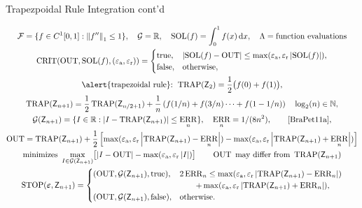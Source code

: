 \documentclass[10pt,compress,xcolor={usenames,dvipsnames},aspectratio=169]{beamer}
\DeclareMathOperator{\TRAP}{TRAP}
\DeclareMathOperator{\STOP}{STOP}
\DeclareMathOperator{\SOL}{SOL}
\DeclareMathOperator{\OUT}{OUT}
\DeclareMathOperator{\CRIT}{CRIT}
\DeclareMathOperator{\ERR}{ERR}
\newcommand{\ttrue}{\textup{true}}
\newcommand{\tfalse}{\textup{false}}
\newcommand{\tolabs}{\varepsilon_{\textup{a}}}
\newcommand{\tolrel}{\varepsilon_{\textup{r}}}
\begin{document}
\begin{frame}{Trapezpoidal Rule Integration cont'd}

\vspace{-6ex}
\begin{gather*}
	\cf = \{f \in C^1[0,1] : \norm[1]{f''} \le 1\}, \quad 
	\cg  = \reals,  \quad
	\SOL(f) = \int_0^1 f(x) \, \dif x, \quad   \Lambda = \text{function evaluations} \\
	\CRIT(\OUT, \SOL(f),(\tolabs, \tolrel))  = \begin{cases} \ttrue, & \abs{\SOL(f) - \OUT} \le \max(\tolabs,\tolrel \abs{\SOL(f)}), \\
		\tfalse, & \text{otherwise},
		\end{cases} \\
		\text{\alert{trapezoidal rule}: } 
		\TRAP(\mZ_2) = \frac 1{2} \bigl( f(0) + f(1) \bigr), \\  
		\TRAP(\mZ_{n+1}) = \frac {1}{2}\TRAP(\mZ_{n/2+1}) + \frac 1{n} \left( f(1/n) + f(3/n) \cdots + f(1 -1/n) \right)  \quad \log_2(n) \in \naturals,\\
		\cg(\mZ_{n+1}) = \{I \in \reals : \abs{I - \TRAP(\mZ_{n+1})} \le \ERR_n\},  \quad \ERR_n =  1/(8n^2), \qquad \text{\cite[(7.15)]{BraPet11a}}, \\ 
		\OUT = \TRAP(\mZ_{n+1}) + \frac 12 \left[\max(\tolabs,\tolrel\abs{\TRAP(\mZ_{n+1})- \ERR_n}) - \max(\tolabs,\tolrel \abs{\TRAP(\mZ_{n+1}) +\ERR_n}) \right] \\
		\text{minimizes }  \max_{I \in \cg(\mZ_{n+1})} \bigl[ \abs{I - \OUT} - \max(\tolabs,\tolrel \abs{I}) 
		\bigr ] \qquad \OUT \text{ may differ from } \TRAP(\mZ_{n+1}) \\
	\STOP(\veps,\mZ_{n+1}) 
	= \begin{cases} 
		(\OUT,\cg(\mZ_{n+1}), \ttrue), & 
		2\ERR_n \le  \max(\tolabs,\tolrel\abs{\TRAP(\mZ_{n+1})- \ERR_n}) \\
		& \qquad + \max(\tolabs,\tolrel\abs{\TRAP(\mZ_{n+1}) +\ERR_n}), \\
		(\OUT,\cg(\mZ_{n+1}),\tfalse), & \text{otherwise}.
	\end{cases}
\end{gather*}

\end{frame}
\end{document}
